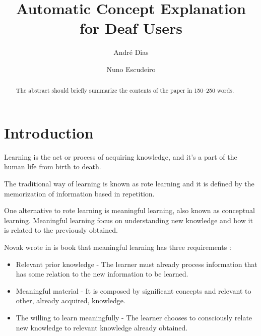 \documentclass[runningheads]{llncs}
\begin{document}
%
\title{Automatic Concept Explanation for Deaf Users}
%
%
\author{André Dias \and
Nuno Escudeiro}
%
%
%
\maketitle              %
%
\begin{abstract}
    The abstract should briefly summarize the contents of the paper in
    150--250 words.

\end{abstract}
%
%
%
\section{Introduction}

Learning is the act or process of acquiring knowledge, and it's a part of the human life from birth to death.

The traditional way of learning is known as rote learning and it is defined by the memorization of information based in repetition.

One alternative to rote learning is meaningful learning, also known as conceptual learning.
Meaningful learning focus on understanding new knowledge and how it is related to the previously obtained.

Novak \cite{novak_2012} wrote in is book that meaningful learning has three requirements :

\begin{itemize}
    \item Relevant prior knowledge - The learner must already process information that has some relation to the new information to be learned.
    \item Meaningful material - It is composed by significant concepts and relevant to other, already acquired, knowledge.
    \item The willing to learn meaningfully - The learner chooses to consciously relate new knowledge to relevant knowledge already obtained.
\end{itemize}
\end{document}
